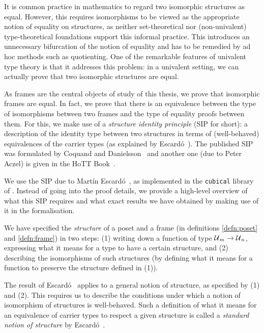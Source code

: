 It is common practice in mathematics to regard two isomorphic structures as equal.
However, this requires isomorphisms to be viewed as the appropriate notion of equality on
structures, as neither set-theoretical nor (non-univalent) type-theoretical foundations
support this informal practice. This introduces an unnecessary bifurcation of the notion
of equality and has to be remedied by ad hoc methods such as quotienting. One of the
remarkable features of univalent type theory is that it addresses this problem: in a
univalent setting, we can actually prove that two isomorphic structures are equal.

As frames are the central objects of study of this thesis, we prove that isomorphic frames
are equal. In fact, we prove that there is an equivalence between the type of isomorphisms
between two frames and the type of equality proofs between them. For this, we make use of
a \emph{structure identity principle} (SIP for short): a description of the identity type
between two structures in terms of (well-behaved) equivalences of the carrier types (as
explained by Escardó~\cite{escardo-uf-intro}). The published SIP was formulated by Coquand
and Danielsson~\cite{coq-nad} and another one (due to Peter Aczel) is given in the HoTT
Book~\cite{hottbook}.

We use the SIP due to Martín Escardó~\cite{escardo-uf-intro}, as implemented in the
\texttt{cubical} library~\cite{agda-cubical} of \veragda{}. Instead of going into the
proof details, we provide a high-level overview of what this SIP requires and what exact
results we have obtained by making use of it in the \veragda{} formalisation.

We have specified the \emph{structure} of a poset and a frame (in definitions
\ref{defn:poset} and \ref{defn:frame}) in two steps: (1) writing down a function of type
$\mathcal{U}{}_m \rightarrow \mathcal{U}{}_n$, expressing what it means for a type to have a certain structure,
and (2) describing the isomorphisms of such structures (by defining what it means for a
function to preserve the structure defined in (1)).

The result of Escardó~\cite{escardo-uf-intro} applies to a general notion of structure, as
specified by (1) and (2). This requires us to describe the conditions under which a notion
of isomorphism of structures is well-behaved. Such a definition of what it means for an
equivalence of carrier types to respect a given structure is called a \emph{standard
  notion of structure} by Escard\'{o}~\cite{escardo-uf-intro}.

